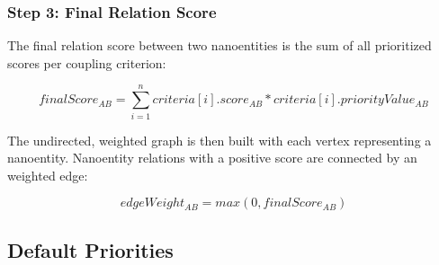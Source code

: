\subsubsection{Step 3: Final Relation Score}

The final relation score between two nanoentities is the sum of all prioritized scores per coupling criterion: 

\begin{displaymath}
finalScore_{AB} = \sum\limits_{i=1}^n criteria[i].score_{AB} * criteria[i].priorityValue_{AB}
\end{displaymath}

The undirected, weighted graph is then built with each vertex representing a nanoentity. Nanoentity relations with a positive score are connected by an weighted edge:

\begin{displaymath}
edgeWeight_{AB} = max(0, finalScore_{AB})	
\end{displaymath}

	
\subsection{Default Priorities}
\label{sec:defaultPriorities}

